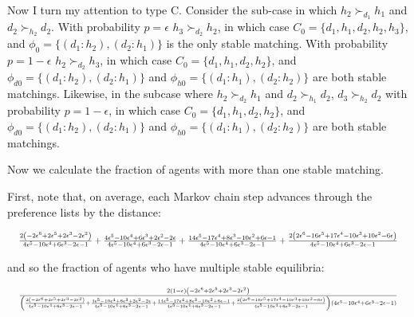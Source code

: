 \documentclass[WP]{AEA}
\begin{document}
Now I turn my attention to type C. Consider the sub-case in which $h_2\succ_{d_1} h_1$ and $d_2\succ_{h_2} d_2$.  With probability $p=\epsilon$ $h_3\succ_{d_2} h_2$, in which case $C_0 =\{d_1,h_1,d_2,h_2, h_3\}$, and $\phi_0=\{(d_1:h_2),(d_2:h_1)\}$ is the only stable matching.  With probability $p=1-\epsilon$ $h_2\succ_{d_2} h_3$, in which case $C_0 =\{d_1,h_1,d_2,h_2\}$, and $\phi_{d0}=\{(d_1:h_2),(d_2:h_1)\}$ and $\phi_{h0}=\{(d_1:h_1),(d_2:h_2)\}$ are both stable matchings.  Likewise, in the subcase where  $h_2\succ_{d_2} h_1$ and $d_2\succ_{h_1} d_2$, $d_3\succ_{h_2} d_2$ with  probability $p=1- \epsilon$, in which case  $C_0 =\{d_1,h_1,d_2,h_2\}$, and $\phi_{d0}=\{(d_1:h_2),(d_2:h_1)\}$ and $\phi_{h0}=\{(d_1:h_1),(d_2:h_2)\}$ are both stable matchings.

Now we calculate the fraction of agents with more than one stable matching.  

First, note that, on average, each Markov chain step advances through the preference lists by the distance:

\begin{equation*}
		\resizebox{\textwidth}{!}{
		$	
			\frac{2 \left(- 2 \epsilon^{6} + 2 \epsilon^{5} + 2 \epsilon^{3} - 2 \epsilon^{2}\right)}{4 \epsilon^{5} - 10 \epsilon^{4} + 6 \epsilon^{3} - 2 \epsilon - 1} + \frac{4 \epsilon^{5} - 10 \epsilon^{4} + 6 \epsilon^{3} + 2 \epsilon^{2} - 2 \epsilon}{4 \epsilon^{5} - 10 \epsilon^{4} + 6 \epsilon^{3} - 2 \epsilon - 1} + \frac{14 \epsilon^{5} - 17 \epsilon^{4} + 8 \epsilon^{3} - 10 \epsilon^{2} + 6 \epsilon - 1}{4 \epsilon^{5} - 10 \epsilon^{4} + 6 \epsilon^{3} - 2 \epsilon - 1} + \frac{2 \left(2 \epsilon^{6} - 16 \epsilon^{5} + 17 \epsilon^{4} - 10 \epsilon^{3} + 10 \epsilon^{2} - 6 \epsilon\right)}{4 \epsilon^{5} - 10 \epsilon^{4} + 6 \epsilon^{3} - 2 \epsilon - 1}
		$
	}
\end{equation*}

and so the fraction of agents who have multiple stable equilibria:

\begin{equation*}
	\resizebox{\textwidth}{!}{
	$
			\frac{2 \left(1 - \epsilon\right) \left(- 2 \epsilon^{6} + 2 \epsilon^{5} + 2 \epsilon^{3} - 2 \epsilon^{2}\right)}{\left(\frac{2 \left(- 2 \epsilon^{6} + 2 \epsilon^{5} + 2 \epsilon^{3} - 2 \epsilon^{2}\right)}{4 \epsilon^{5} - 10 \epsilon^{4} + 6 \epsilon^{3} - 2 \epsilon - 1} + \frac{4 \epsilon^{5} - 10 \epsilon^{4} + 6 \epsilon^{3} + 2 \epsilon^{2} - 2 \epsilon}{4 \epsilon^{5} - 10 \epsilon^{4} + 6 \epsilon^{3} - 2 \epsilon - 1} + \frac{14 \epsilon^{5} - 17 \epsilon^{4} + 8 \epsilon^{3} - 10 \epsilon^{2} + 6 \epsilon - 1}{4 \epsilon^{5} - 10 \epsilon^{4} + 6 \epsilon^{3} - 2 \epsilon - 1} + \frac{2 \left(2 \epsilon^{6} - 16 \epsilon^{5} + 17 \epsilon^{4} - 10 \epsilon^{3} + 10 \epsilon^{2} - 6 \epsilon\right)}{4 \epsilon^{5} - 10 \epsilon^{4} + 6 \epsilon^{3} - 2 \epsilon - 1}\right) \left(4 \epsilon^{5} - 10 \epsilon^{4} + 6 \epsilon^{3} - 2 \epsilon - 1\right)}
	$
}
\end{equation*}
\end{document}
